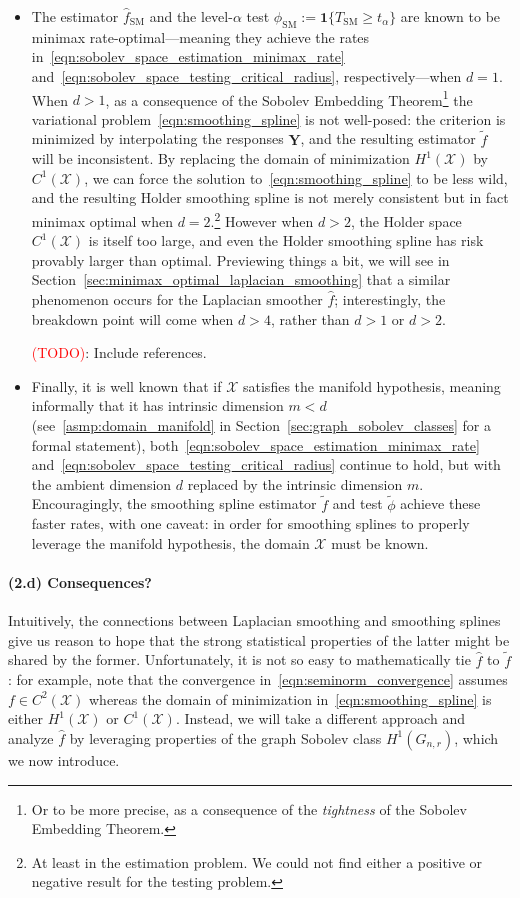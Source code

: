 \documentclass{article}
\newcommand{\1}{\mathbf{1}}
\newcommand{\Xset}{\mathcal{X}}
\newcommand{\wt}[1]{\widetilde{#1}}
\newcommand{\wh}[1]{\widehat{#1}}
\newcommand{\SM}{\mathrm{SM}}
\theoremstyle{alden}
\theoremstyle{aldenthm}
\theoremstyle{definition}
\theoremstyle{remark}
\begin{document}
\begin{itemize}
	\item The estimator $\wh{f}_{\SM}$ and the level-$\alpha$ test $\phi_{\SM} := \1\{T_{\SM} \geq {t}_{\alpha}\}$ are known to be minimax rate-optimal---meaning they achieve the rates in~\eqref{eqn:sobolev_space_estimation_minimax_rate} and~\eqref{eqn:sobolev_space_testing_critical_radius}, respectively---when $d = 1$. When $d > 1$, as a consequence of the Sobolev Embedding Theorem\footnote{Or to be more precise, as a consequence of the \emph{tightness} of the Sobolev Embedding Theorem.} the variational problem~\eqref{eqn:smoothing_spline} is not well-posed: the criterion is minimized by interpolating the responses $\mathbf{Y}$, and the resulting estimator $\wt{f}$ will be inconsistent. By replacing the domain of minimization $H^1(\Xset)$ by $C^1(\Xset)$, we can force the solution to~\eqref{eqn:smoothing_spline} to be less wild, and the resulting Holder smoothing spline is not merely consistent but in fact minimax optimal when $d = 2$.\footnote{At least in the estimation problem. We could not find either a positive or negative result for the testing problem.} However when $d > 2$, the Holder space $C^1(\Xset)$ is itself too large, and even the Holder smoothing spline has risk provably larger than optimal. Previewing things a bit, we will see in Section~\ref{sec:minimax_optimal_laplacian_smoothing} that a similar phenomenon occurs for the Laplacian smoother $\wh{f}$; interestingly, the breakdown point will come when $d > 4$, rather than $d > 1$ or $d > 2$.
	
	\textcolor{red}{(TODO)}: Include references.
	
	\item Finally, it is well known that if $\Xset$ satisfies the manifold hypothesis, meaning informally that it has intrinsic dimension $m < d$ (see~\ref{asmp:domain_manifold} in Section~\ref{sec:graph_sobolev_classes} for a formal statement), both~\eqref{eqn:sobolev_space_estimation_minimax_rate} and~\eqref{eqn:sobolev_space_testing_critical_radius} continue to hold, but with the ambient dimension $d$ replaced by the intrinsic dimension $m$. Encouragingly, the smoothing spline estimator $\wt{f}$ and test $\wt{\phi}$ achieve these faster rates, with one caveat: in order for smoothing splines to properly leverage the manifold hypothesis, the domain $\Xset$ must be known.
\end{itemize}

\paragraph{(2.d) Consequences?} Intuitively, the connections between Laplacian smoothing and smoothing splines give us reason to hope that the strong statistical properties of the latter might be shared by the former. Unfortunately, it is not so easy to mathematically tie $\wh{f}$ to $\wt{f}$: for example, note that the convergence in~\eqref{eqn:seminorm_convergence} assumes $f \in C^2(\Xset)$ whereas the domain of minimization in~\eqref{eqn:smoothing_spline} is either $H^1(\Xset)$ or $C^1(\Xset)$. Instead, we will take a different approach and analyze $\wh{f}$ by leveraging properties of the graph Sobolev class $H^1(G_{n,r})$, which we now introduce.
\end{document}
